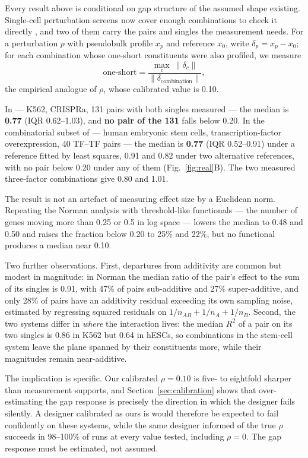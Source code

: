 \documentclass[11pt]{article}
\begin{document}
Every result above is conditional on gap structure of the assumed shape
existing. Single-cell perturbation screens now cover enough combinations to
check it directly \citep{replogle2022, peidli2024}, and two of them carry the
pairs and singles the measurement needs. For a perturbation $p$ with
pseudobulk profile $x_p$ and reference $x_0$, write
$\delta_p = x_p - x_0$; for each combination whose one-short constituents were
also profiled, we measure
\begin{equation}
  \text{one-short} =
  \frac{\max_{c}\ \lVert \delta_c \rVert}{\lVert \delta_{\text{combination}} \rVert},
  \label{eq:oneshort}
\end{equation}
the empirical analogue of $\rho$, whose calibrated value is 0.10.

In \citet{norman2019} --- K562, CRISPRa, 131 pairs with both singles measured
--- the median is \textbf{0.77} (IQR 0.62--1.03), and \textbf{no pair of the 131}
falls below 0.20. In the combinatorial subset of \citet{joung2023} --- human
embryonic stem cells, transcription-factor overexpression, 40 TF--TF pairs ---
the median is \textbf{0.77} (IQR 0.52--0.91) under a reference fitted by least
squares, 0.91 and 0.82 under two alternative references, with no pair below 0.20
under any of them (Fig.~\ref{fig:real}B). The two measured three-factor
combinations give 0.80 and 1.01.

The result is not an artefact of measuring effect size by a Euclidean norm.
Repeating the Norman analysis with threshold-like functionals --- the number of
genes moving more than 0.25 or 0.5 in log space --- lowers the median to 0.48
and 0.50 and raises the fraction below 0.20 to 25\% and 22\%, but no functional
produces a median near 0.10.

Two further observations. First, departures from additivity are common but
modest in magnitude: in Norman the median ratio of the pair's effect to the sum
of its singles is 0.91, with 47\% of pairs sub-additive and 27\% super-additive,
and only 28\% of pairs have an additivity residual exceeding its own sampling
noise, estimated by regressing squared residuals on
$1/n_{AB} + 1/n_A + 1/n_B$. Second, the two systems differ in \emph{where} the
interaction lives: the median $R^2$ of a pair on its two singles is 0.86 in
K562 but 0.64 in hESCs, so combinations in the stem-cell system leave the plane
spanned by their constituents more, while their magnitudes remain near-additive.

The implication is specific. Our calibrated $\rho = 0.10$ is five- to eightfold
sharper than measurement supports, and Section~\ref{sec:calibration} shows that
over-estimating the gap response is precisely the direction in which the
designer fails silently. A designer calibrated as ours is would therefore be
expected to fail confidently on these systems, while the same designer informed
of the true $\rho$ succeeds in 98--100\% of runs at every value tested,
including $\rho = 0$. The gap response must be estimated, not assumed.
\end{document}
